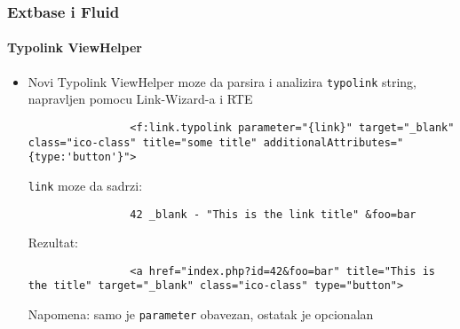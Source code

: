 
\begin{frame}[fragile]
	\frametitle{Extbase i Fluid}
	\framesubtitle{Typolink ViewHelper}

	\lstset{
		basicstyle=\tiny\ttfamily
	}

	\begin{itemize}
		\item Novi Typolink ViewHelper moze da parsira i analizira \texttt{typolink} string, napravljen pomocu  Link-Wizard-a i RTE

			\begin{lstlisting}
				<f:link.typolink parameter="{link}" target="_blank" class="ico-class" title="some title" additionalAttributes="{type:'button'}">
			\end{lstlisting}

			\texttt{link} moze da sadrzi:
			\begin{lstlisting}
				42 _blank - "This is the link title" &foo=bar
			\end{lstlisting}

			Rezultat:
			\begin{lstlisting}
				<a href="index.php?id=42&foo=bar" title="This is the title" target="_blank" class="ico-class" type="button">
			\end{lstlisting}

			Napomena: samo je \texttt{parameter} obavezan, ostatak je opcionalan

	\end{itemize}

\end{frame}



